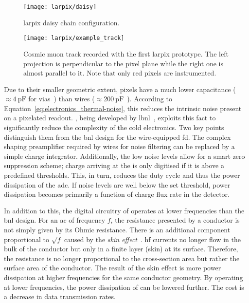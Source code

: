 \begin{figure}[htb]
	\centering
	\texttt{[image: larpix/daisy]}
	\caption[ daisy chain]{%
		\acrshort{larpix} daisy chain configuration.~\cite{larpix_spec}
	}
	\label{fig:larpix_daisy}
\end{figure}

\begin{figure}[htb]
	\centering
	\texttt{[image: larpix/example\_track]}
	\caption[ prototype event]{%
		Cosmic muon track recorded with the first \acrshort{larpix} prototype.
		The left projection is perpendicular to the pixel plane while the right one is almost parallel to it.
		Note that only red pixels are instrumented.~\cite{danLarpix}
	}
	\label{fig:larpix_track}
\end{figure}

Due to their smaller geometric extent, pixels have a much lower capacitance ($\approx \SI{4}{\pico\farad}$ for vias~\cite{larpix_spec}) than wires ($\approx \SI{200}{\pico\farad}$~\cite{protodune-sp}).
According to Equation~\eqref{eq:electronics_thermal-noise}, this reduces the intrinsic noise present on a pixelated readout.
\larpix{}, being developed by \gls{lbnl}~\cite{larpix, larpix_spec}, exploits this fact to significantly reduce the complexity of the cold electronics.
Two key points distinguish them from the \gls{bnl} design for the wire-equipped \gls{fd}.
The complex shaping preamplifier required by wires for noise filtering can be replaced by a simple charge integrator.
Additionally, the low noise levels allow for a smart zero suppression scheme; charge arriving at the \larpix{} is only digitised if it is above a predefined thresholds.
This, in turn, reduces the duty cycle and thus the power dissipation of the \gls{adc}.
If noise levels are well below the set threshold, power dissipation becomes primarily a function of charge flux rate in the detector.

In addition to this, the digital circuitry of \larpix{} operates at lower frequencies than the \gls{bnl} design.
For an \gls{ac} of frequency $f$, the resistance presented by a conductor is not simply given by its Ohmic resistance.
There is an additional component proportional to $\sqrt{f}$ caused by the \emph{skin effect}~\cite{horowitzHill}.
\gls{hf} currents no longer flow in the bulk of the conductor but only in a finite layer (skin) at its surface.
Therefore, the resistance is no longer proportional to the cross-section area but rather the surface area of the conductor.
The result of the skin effect is more power dissipation at higher frequencies for the same conductor geometry.
By operating at lower frequencies, the power dissipation of \larpix{} can be lowered further.
The cost is a decrease in data transmission rates.


